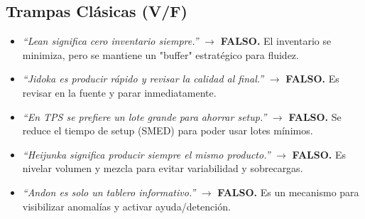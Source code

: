 \subsection{Trampas Clásicas (V/F)}
\begin{itemize}
    \item \textit{``Lean significa cero inventario siempre.''} $\rightarrow$ \textbf{FALSO.} El inventario se minimiza, pero se mantiene un "buffer" estratégico para fluidez.
    \item \textit{``Jidoka es producir rápido y revisar la calidad al final.''} $\rightarrow$ \textbf{FALSO.} Es revisar en la fuente y parar inmediatamente.
    \item \textit{``En TPS se prefiere un lote grande para ahorrar setup.''} $\rightarrow$ \textbf{FALSO.} Se reduce el tiempo de setup (SMED) para poder usar lotes mínimos.
    \item \textit{``Heijunka significa producir siempre el mismo producto.''} $\rightarrow$ \textbf{FALSO.} Es nivelar volumen y mezcla para evitar variabilidad y sobrecargas.
    \item \textit{``Andon es solo un tablero informativo.''} $\rightarrow$ \textbf{FALSO.} Es un mecanismo para visibilizar anomalías y activar ayuda/detención.
\end{itemize}
